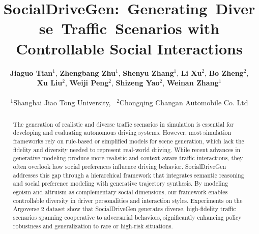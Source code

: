 \documentclass[10pt]{article} %
\title{ SocialDriveGen:~Generating~Diverse~Traffic~Scenarios with  Controllable Social Interactions
}
\author{\textbf{Jiaguo Tian}$^{1}$, \textbf{Zhengbang Zhu}$^{1}$, \textbf{Shenyu Zhang}$^{1}$, \textbf{Li Xu}$^{2}$, \textbf{Bo Zheng}$^{2}$, \\
  \textbf{Xu Liu}$^{2}$, \textbf{Weiji Peng}$^{2}$, \textbf{Shizeng Yao}$^{2}$, \textbf{Weinan Zhang}$^{1}$ \\
  \\ 
  $^{1}$Shanghai Jiao Tong University, \,
  $^{2}$Chongqing Changan Automobile Co. Ltd \\
}
\begin{document}
\maketitle
\thispagestyle{empty}
\pagestyle{empty}

\begin{abstract}
The generation of realistic and diverse traffic scenarios in simulation is essential for developing and evaluating autonomous driving systems. However, most simulation frameworks rely on rule-based or simplified models for scene generation, which lack the fidelity and diversity needed to represent real-world driving. While recent advances in generative modeling produce more realistic and context-aware traffic interactions, they often overlook how social preferences influence driving behavior. SocialDriveGen addresses this gap through a hierarchical framework that integrates semantic reasoning and social preference modeling with generative trajectory synthesis. By modeling egoism and altruism as complementary social dimensions, our framework enables controllable diversity in driver personalities and interaction styles. Experiments on the Argoverse 2 dataset show that SocialDriveGen generates diverse, high-fidelity traffic scenarios spanning cooperative to adversarial behaviors, significantly enhancing policy robustness and generalization to rare or high-risk situations.

\end{abstract}


% 



% 
% 

% 


\end{document}
